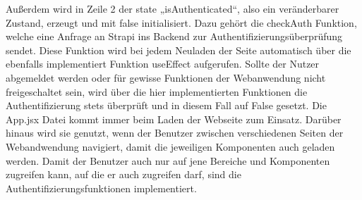 Außerdem wird in Zeile 2 der state „isAuthenticated“, also ein veränderbarer Zustand, erzeugt und mit false initialisiert. Dazu gehört die checkAuth Funktion, welche eine Anfrage an Strapi ins Backend zur Authentifizierungsüberprüfung sendet. Diese Funktion wird bei jedem Neuladen der Seite automatisch über die ebenfalls implementiert Funktion useEffect aufgerufen.
Sollte der Nutzer abgemeldet werden oder für gewisse Funktionen der Webanwendung nicht freigeschaltet sein, wird über die hier implementierten Funktionen die Authentifizierung stets überprüft und in diesem Fall auf False gesetzt.
Die App.jsx Datei kommt immer beim Laden der Webseite zum Einsatz. Darüber hinaus wird sie genutzt, wenn der Benutzer zwischen verschiedenen Seiten der Webandwendung navigiert, damit die jeweiligen Komponenten auch geladen werden. Damit der Benutzer auch nur auf jene Bereiche und Komponenten zugreifen kann, auf die er auch zugreifen darf, sind die Authentifizierungsfunktionen implementiert.